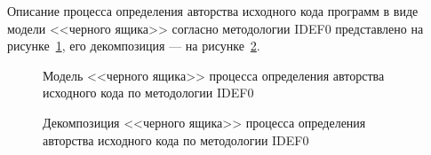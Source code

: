 Описание процесса определения авторства исходного кода программ в виде модели <<черного ящика>> согласно 
методологии IDEF0 представлено на рисунке~\ref{box_1:box_1}, его декомпозиция --- на рисунке~\ref{box_2:box_2}.

\begin{figure}[h!]
\caption{ Модель <<черного ящика>> процесса определения авторства исходного кода по методологии IDEF0 }
\label{box_1:box_1}
\end{figure} 

\begin{figure}[h!]
\caption{ Декомпозиция <<черного ящика>> процесса определения авторства исходного кода по методологии IDEF0 }
\label{box_2:box_2}
\end{figure} 

\clearpage